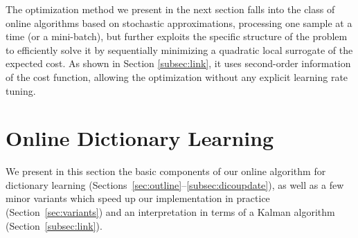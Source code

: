 \documentclass[twoside,11pt]{article}
\begin{document}
The optimization method we present in the next section falls into the
class of online algorithms based on stochastic approximations, processing one
sample at a time (or a mini-batch), but further exploits the specific
structure of the problem to efficiently solve it by sequentially minimizing a
quadratic local surrogate of the expected cost.
As shown in Section \ref{subsec:link}, it uses second-order information of the cost 
function, allowing the optimization without any explicit learning rate
tuning.
\section{Online Dictionary Learning} \label{sec:online}
We present in this section the basic components of our online
algorithm for dictionary learning
(Sections~\ref{sec:outline}--\ref{subsec:dicoupdate}), as well as a
few minor variants which speed up our implementation in practice
(Section~\ref{sec:variants}) and an interpretation in terms of
a Kalman algorithm (Section~\ref{subsec:link}).
\end{document}
